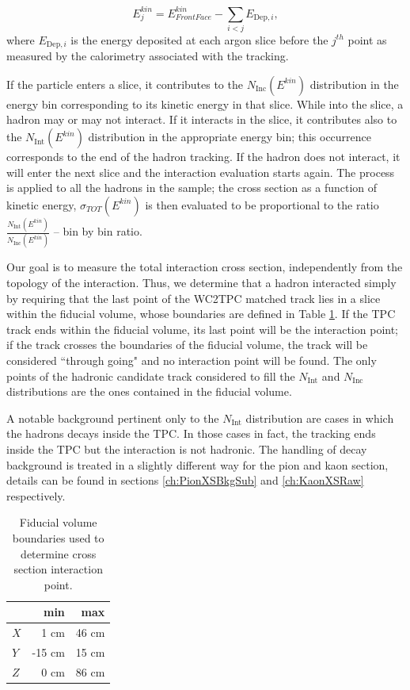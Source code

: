 \begin{equation}
 E_{j}^{kin} =  E^{kin}_{Front Face} - \sum_{i < j} E_{\text{Dep},i},
\label{eq:KEj}
\end{equation}
where $E_{\text{Dep},i}$ is the energy deposited at each argon slice before the $j^{th}$ point as measured by the calorimetry associated with the tracking.


If the particle enters a slice, it contributes to the $N_{\text{Inc}}( E^{kin})$ distribution in the energy bin corresponding to its kinetic energy in that slice. While into the slice, a hadron may or may not interact. If it interacts in the slice, it  contributes also to the $N_{\text{Int}}(E^{kin})$ distribution in the appropriate energy bin; this occurrence corresponds to the end of the hadron tracking. If the hadron does not interact, it will enter the next slice and the interaction evaluation starts again.
The process is applied to all the hadrons in the sample; the cross section as a function of kinetic energy, $\sigma_{TOT}( E^{kin})$ is then evaluated to be proportional to the ratio $\frac{N_{\text{Int}}( E^{kin})}{N_{\text{Inc}}( E^{kin})}$ -- bin by bin ratio. 


Our goal is to measure the total interaction cross section, independently  from the topology of the interaction. Thus, we determine that a hadron interacted simply by requiring that the last point of the WC2TPC matched track lies in a slice within the fiducial volume, whose boundaries are defined in Table \ref{tab:FidVol}. If the TPC track ends within the fiducial volume, its last point will be the interaction point; if the track crosses the boundaries of the fiducial volume, the track will be considered ``through going" and no interaction point will be found. The only points of the hadronic candidate track considered to fill the  $N_{\text{Int}}$ and  $N_{\text{Inc}}$ distributions are the ones contained in the fiducial volume. 
 
 A notable background pertinent only to the $N_{\text{Int}}$  distribution are cases in which the hadrons decays inside the TPC. In those cases in fact, the tracking ends inside the TPC but the interaction is not hadronic. The handling of decay background is treated in a slightly different way for the pion and kaon section, details can be found in sections \ref{ch:PionXSBkgSub} and \ref{ch:KaonXSRaw} respectively.



\begin{table}[t]
\centering
\begin{tabular}{|l|r|r|}
\hline
& min   &  max  \\ \hline
$X$ & 1 cm   & 46 cm  \\ \hline
$Y$ & -15 cm   & 15  cm  \\ \hline
$Z$ & 0 cm   & 86 cm  \\ \hline
\end{tabular}
\caption{Fiducial volume boundaries used to determine cross section interaction point. }
\label{tab:FidVol}
\end{table}



